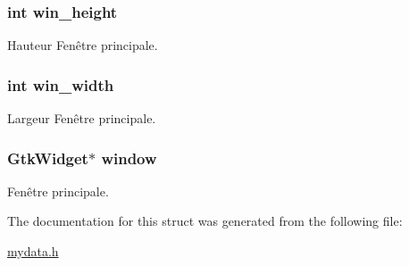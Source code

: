 \subsubsection[{\texorpdfstring{win\+\_\+height}{win_height}}]{\setlength{\rightskip}{0pt plus 5cm}int win\+\_\+height}\hypertarget{struct_mydata_a043cefe0d8f27979f9813b61305f1407}{}\label{struct_mydata_a043cefe0d8f27979f9813b61305f1407}
Hauteur Fenêtre principale. 
\subsubsection[{\texorpdfstring{win\+\_\+width}{win_width}}]{\setlength{\rightskip}{0pt plus 5cm}int win\+\_\+width}\hypertarget{struct_mydata_a3f05049836bf74dcfbc800d417bedec3}{}\label{struct_mydata_a3f05049836bf74dcfbc800d417bedec3}
Largeur Fenêtre principale. 
\subsubsection[{\texorpdfstring{window}{window}}]{\setlength{\rightskip}{0pt plus 5cm}Gtk\+Widget$\ast$ window}\hypertarget{struct_mydata_a3d346c08cf2d67c388caabffb412b293}{}\label{struct_mydata_a3d346c08cf2d67c388caabffb412b293}
Fenêtre principale. 

The documentation for this struct was generated from the following file\+:\begin{DoxyCompactItemize}
\item 
\hyperlink{mydata_8h}{mydata.\+h}\end{DoxyCompactItemize}
